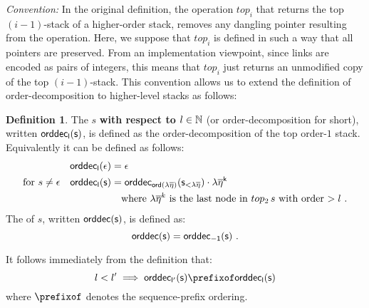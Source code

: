 \documentclass[a4paper]{article}
\theoremstyle{remark}
\theoremstyle{definition}
\newtheorem{definition}{Definition}[section]
\newcommand\orddec{\sf orddec}
\newcommand\sig{\sf sig}
\begin{document}
\smallskip

\emph{Convention:} In the original definition, the operation $top_i$ that returns the top $(i-1)$-stack of a higher-order stack, removes any dangling pointer resulting from the operation. Here, we suppose that $top_i$ is defined in such a way that all pointers are preserved. From an implementation viewpoint, since links are encoded as pairs of integers, this means that $top_i$ just returns an unmodified copy of the top $(i-1)$-stack. This convention allows us to
extend the definition of order-decomposition to higher-level stacks as follows:

\begin{definition}
The  $s$ {\bf with respect to $l\in \mathbb{N}$} (or
order-decomposition for short), written $\orddec_l(s)$, is defined as the order-decomposition of the top order-$1$  stack. Equivalently it can be defined as follows:
\begin{align*}
  \orddec_l(\epsilon) &= \epsilon \\
    \mbox{for } s\neq\epsilon\quad \orddec_l(s) &=     \orddec_{\ord{\lambda\overline{\eta}}}(s_{<\lambda\overline{\eta}}) \cdot \lambda\overline{\eta}^k \\
& \mbox{\quad where } \lambda\overline{\eta}^k \mbox{ is the last node in $top_2\,s$ with order $>l$\ .}
\end{align*}
The  of $s$, written
$\orddec(s)$, is defined as:
$$
\orddec(s) = \orddec_{-1}(s) \ .
$$
\end{definition}

%
It follows immediately from the definition that:
\begin{equation}
l<l' \implies \orddec_{l'}(s) \prefixof \orddec_{l}(s)
\label{eqn_safe_prefix}\end{equation}
where $\prefixof$ denotes the sequence-prefix ordering.
\end{document}
